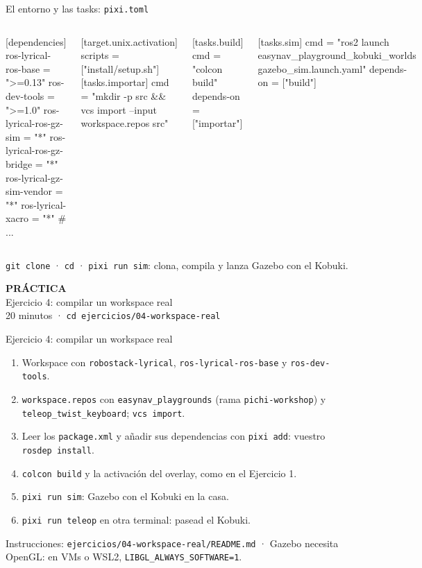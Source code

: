 \documentclass[aspectratio=169]{beamer}
\newcommand{\practicaframe}[2]{%
\begin{frame}
  \centering
  \vfill
  {\Large \textbf{PRÁCTICA}}\\[1em]
  {\large #1}\\[0.5em]
  {\color{halfgray} #2}
  \vfill
\end{frame}%
}
\begin{document}
\begin{frame}[fragile]{El entorno y las tasks: \texttt{pixi.toml}}
\begin{columns}[T]
[dependencies]
ros-lyrical-ros-base = ">=0.13"
ros-dev-tools = ">=1.0"
ros-lyrical-ros-gz-sim = "*"
ros-lyrical-ros-gz-bridge = "*"
ros-lyrical-gz-sim-vendor = "*"
ros-lyrical-xacro = "*"
# ...

[target.unix.activation]
scripts = ["install/setup.sh"]
[tasks.importar]
cmd = "mkdir -p src && vcs import --input workspace.repos src"

[tasks.build]
cmd = "colcon build"
depends-on = ["importar"]

[tasks.sim]
cmd = "ros2 launch easynav_playground_kobuki_worlds gazebo_sim.launch.yaml"
depends-on = ["build"]
\end{columns}
\vfill
\centering \lstinline|git clone| · \lstinline|cd| · \lstinline|pixi run sim|: clona, compila y lanza Gazebo con el Kobuki.
\end{frame}

\practicaframe{Ejercicio 4: compilar un workspace real}{20 minutos · \texttt{cd ejercicios/04-workspace-real}}

\begin{frame}{Ejercicio 4: compilar un workspace real}
\begin{enumerate}
    \item Workspace con \texttt{robostack-lyrical}, \lstinline|ros-lyrical-ros-base| y \lstinline|ros-dev-tools|.
    \item \lstinline|workspace.repos| con \texttt{easynav\_playgrounds} (rama \texttt{pichi-workshop}) y \texttt{teleop\_twist\_keyboard}; \lstinline|vcs import|.
    \item Leer los \lstinline|package.xml| y añadir sus dependencias con \lstinline|pixi add|: vuestro \lstinline|rosdep install|.
    \item \lstinline|colcon build| y la activación del overlay, como en el Ejercicio 1.
    \item \lstinline|pixi run sim|: Gazebo con el Kobuki en la casa.
    \item \lstinline|pixi run teleop| en otra terminal: pasead el Kobuki.
\end{enumerate}
\vfill
\small Instrucciones: \texttt{ejercicios/04-workspace-real/README.md} · Gazebo necesita OpenGL: en VMs o WSL2, \lstinline|LIBGL_ALWAYS_SOFTWARE=1|.
\end{frame}
\end{document}
